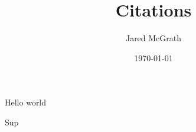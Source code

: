 \documentclass[
    draft,
    final,
]{../mthe-report}
\title{Citations}
\author{Jared McGrath}
\date{\today}
\begin{document}
    \maketitle
    \thispagestyle{empty}
    \newpage
    \frontmatter
    \tableofcontents
    \listoffigures

    \mainmatter{}
    
    Hello world
    
    \cite{McGrath_Optimization_of_Data}
    
    \cite{mip_2008}

    \backmatter{}
    \appendix
    Sup
\end{document}
